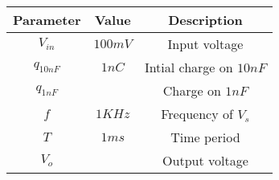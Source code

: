 \begin{tabular}{|c|c|c|}
        \hline
        \textbf{Parameter} & \textbf{Value} & \textbf{Description} \\
        \hline
        $V_{in}$ & $100mV$ & Input voltage \\
        \hline
        $q_{10nF}$ & $1nC$ & Intial charge on $10nF$ \\
        \hline
        $q_{1nF}$ & & Charge on $1nF$\\
        \hline
        $f$ & $1KHz$ & Frequency of $V_s$ \\
        \hline
        $T$ & $1ms$ & Time period\\
        \hline
        $V_o$ &  & Output voltage \\
        \hline
    \end{tabular}

